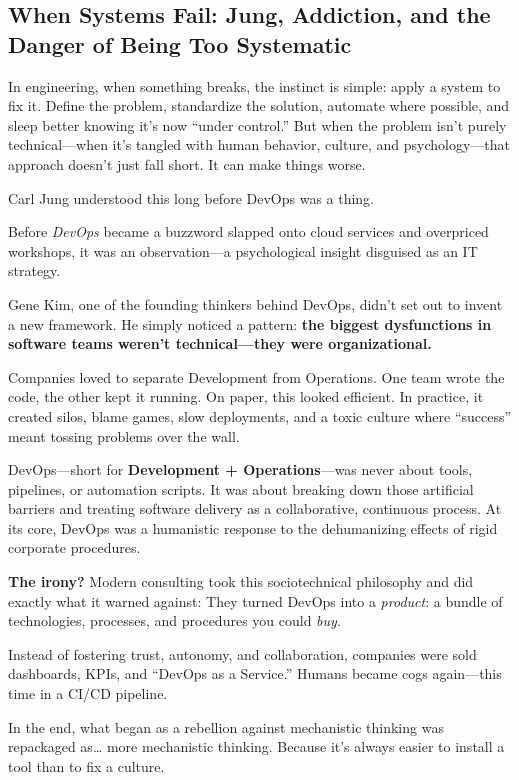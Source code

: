\subsection{When Systems Fail: Jung, Addiction, and the Danger of Being Too Systematic}

In engineering, when something breaks, the instinct is simple: apply a system to fix it. Define the problem, standardize the solution, automate where possible, and sleep better knowing it’s now ``under control.'' But when the problem isn’t purely technical—when it’s tangled with human behavior, culture, and psychology—that approach doesn’t just fall short. It can make things worse.

Carl Jung understood this long before DevOps was a thing.

\begin{tcolorbox}[
  title=Jung’s Warning: Not Every Problem Has a Systematic Fix,
  colback=gray!5,
  colframe=black,
  fonttitle=\bfseries,
  sharp corners=south,
  boxrule=0.5pt,
  enhanced,
  breakable
]

Before \textit{DevOps} became a buzzword slapped onto cloud services and overpriced workshops, it was an observation—a psychological insight disguised as an IT strategy.

\medskip

Gene Kim, one of the founding thinkers behind DevOps, didn’t set out to invent a new framework. He simply noticed a pattern:  \textbf{the biggest dysfunctions in software teams weren’t technical—they were organizational.}  

\medskip

Companies loved to separate Development from Operations. One team wrote the code, the other kept it running. On paper, this looked efficient. In practice, it created silos, blame games, slow deployments, and a toxic culture where “success” meant tossing problems over the wall.

\medskip

DevOps—short for \textbf{Development + Operations}—was never about tools, pipelines, or automation scripts. It was about breaking down those artificial barriers and treating software delivery as a collaborative, continuous process. At its core, DevOps was a humanistic response to the dehumanizing effects of rigid corporate procedures.

\medskip

\textbf{The irony?}  Modern consulting took this sociotechnical philosophy and did exactly what it warned against:  They turned DevOps into a \textit{product}: a bundle of technologies, processes, and procedures you could \textit{buy}.

\medskip

Instead of fostering trust, autonomy, and collaboration, companies were sold dashboards, KPIs, and ``DevOps as a Service.''  Humans became cogs again—this time in a CI/CD pipeline.

\medskip

In the end, what began as a rebellion against mechanistic thinking was repackaged as… more mechanistic thinking.  Because it’s always easier to install a tool than to fix a culture.

\end{tcolorbox}

